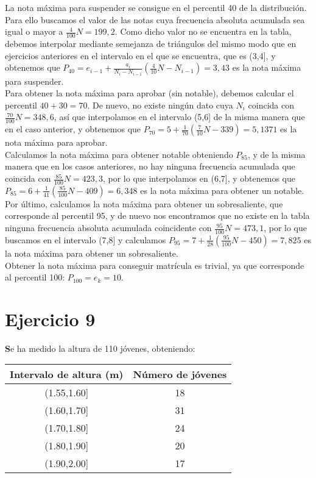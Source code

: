 \documentclass[a4paper,12pt]{article}
\begin{document}
La nota máxima para suspender se consigue en el percentil 40 de la distribución. Para ello buscamos el valor de las notas cuya frecuencia absoluta acumulada sea igual o mayor a $\frac{4}{100}N=199,2$. Como dicho valor no se encuentra en la tabla, debemos interpolar mediante semejanza de triángulos del mismo modo que en ejercicios anteriores en el intervalo en el que se encuentra, que es (3,4], y obtenemos que $P_{40}=e_{i-1}+\frac{a_i}{N_i-N_{i-1}}(\frac{4}{10}N-N_{i-1}) = 3,43$ es la nota máxima para suspender.\\

Para obtener la nota máxima para aprobar (sin notable), debemos calcular el percentil $40+30=70$. De nuevo, no existe ningún dato cuya $N_i$ coincida con $\frac{70}{100}N= 348,6$, así que interpolamos en el intervalo (5,6] de la misma manera que en el caso anterior, y obtenemos que $P_{70}=5+\frac{1}{70}(\frac{7}{10}N-339)=5,1371$ es la nota máxima para aprobar.\\

Calculamos la nota máxima para obtener notable obteniendo $P_{85}$, y de la misma manera que en los casos anteriores, no hay ninguna frecuencia acumulada que coincida con $\frac{85}{100}N=423,3$, por lo que interpolamos en (6,7], y obtenemos que $P_{85}=6+\frac{1}{41}(\frac{85}{100}N-409)=6,348$ es la nota máxima para obtener un notable.\\

Por último, calculamos la nota máxima para obtener un sobresaliente, que corresponde al percentil 95, y de nuevo nos encontramos que no existe en la tabla ninguna frecuencia absoluta acumulada coincidente con $\frac{95}{100}N=473,1$, por lo que buscamos en el intervalo (7,8] y calculamos $P_{95}=7+\frac{1}{28}(\frac{95}{100}N-450)=7,825$ es la nota máxima para obtener un sobresaliente.\\

Obtener la nota máxima para conseguir matrícula es trivial, ya que corresponde al percentil 100: $P_{100}=e_k=10$.\\

\section*{Ejercicio 9}
\textbf Se ha medido la altura de 110 jóvenes, obteniendo:

\begin{center}
    \begin{tabular}{c|c}
        Intervalo de altura (m) & Número de jóvenes \\
        \hline
        (1.55,1.60] & 18 \\
        (1.60,1.70] & 31 \\
        (1.70,1.80] & 24 \\
        (1.80,1.90] & 20 \\
        (1.90,2.00] & 17 \\
    \end{tabular}
\end{center}
\end{document}
